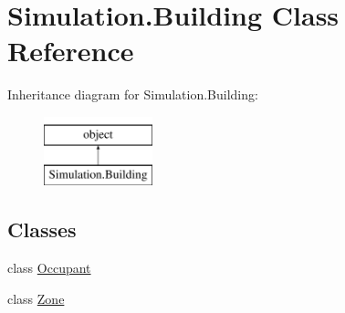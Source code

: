 \hypertarget{class_c_simulation_1_1_simulation_1_1_building}{}\section{Simulation.\+Building Class Reference}
\label{class_c_simulation_1_1_simulation_1_1_building}
Inheritance diagram for Simulation.\+Building\+:\begin{figure}[H]
\begin{center}
\leavevmode
\includegraphics[height=2.000000cm]{class_c_simulation_1_1_simulation_1_1_building}
\end{center}
\end{figure}
\subsection*{Classes}
\begin{DoxyCompactItemize}
\item 
class \hyperlink{class_c_simulation_1_1_simulation_1_1_building_1_1_occupant}{Occupant}
\item 
class \hyperlink{class_c_simulation_1_1_simulation_1_1_building_1_1_zone}{Zone}
\end{DoxyCompactItemize}
